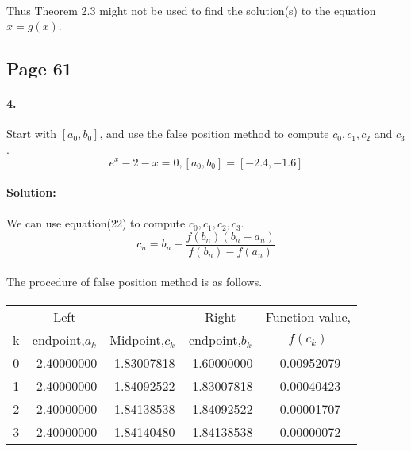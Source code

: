 \documentclass{article}  %
\begin{document}
        \paragraph{}Thus Theorem 2.3 might not be used to find the solution(s) to the equation $x = g(x)$.            
        \subsection*{Page 61} 
        \paragraph{4.}Start with $[a_0, b_0]$, and use the false position method to compute $c_0, c_1, c_2$ and $c_3$.
        $$e^x - 2 - x = 0, [a_0, b_0] = [-2.4, -1.6] $$
        \paragraph{Solution:}
        \paragraph{}We can use equation(22) to compute $c_0, c_1, c_2, c_3$.
        $$c_n = b_n - \frac{f(b_n)(b_n - a_n)}{f(b_n) - f(a_n)}$$
        \paragraph{}The procedure of false position method is as follows.
        \paragraph{}
        \renewcommand\tabcolsep{10.0pt} %
            \begin{threeparttable} %
                \begin{tabular}{c|c|c|c|c} 
                \hline
                 & Left & & Right & Function value, \\ 
                k & endpoint,$a_k$ & Midpoint,$c_k$ & endpoint,$b_k$ & $f(c_k)$ \\
                \hline
                0 & -2.40000000 & -1.83007818 & -1.60000000 & -0.00952079 \\
                1 & -2.40000000 & -1.84092522 & -1.83007818 & -0.00040423 \\
                2 & -2.40000000 & -1.84138538 & -1.84092522 & -0.00001707 \\
                3 & -2.40000000 & -1.84140480 & -1.84138538 & -0.00000072 \\
                \end{tabular} 
            \end{threeparttable}
\end{document}
